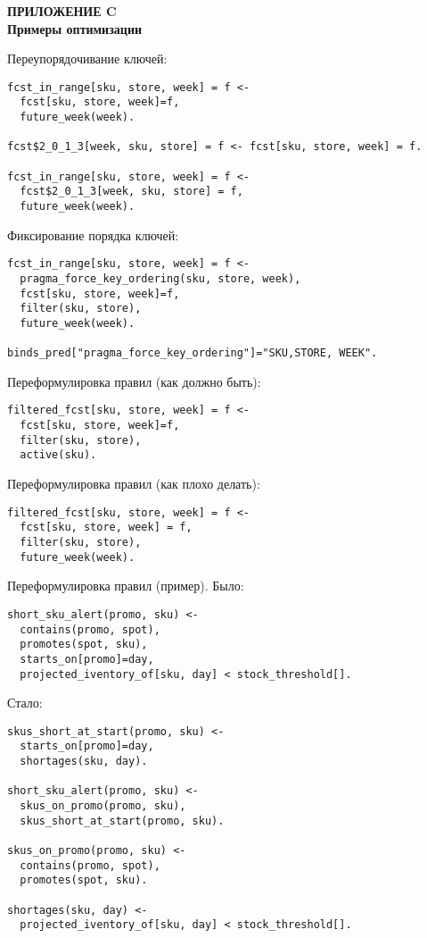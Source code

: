 \newpage
\begin{center}
\textbf{
\MakeUppercase{Приложение C}\\
Примеры оптимизации}
\end{center}

Переупорядочивание ключей:

\begin{lstlisting}
fcst_in_range[sku, store, week] = f <-
  fcst[sku, store, week]=f,
  future_week(week).

fcst$2_0_1_3[week, sku, store] = f <- fcst[sku, store, week] = f.

fcst_in_range[sku, store, week] = f <-
  fcst$2_0_1_3[week, sku, store] = f,
  future_week(week).
\end{lstlisting}

Фиксирование порядка ключей:

\begin{lstlisting}
fcst_in_range[sku, store, week] = f <-
  pragma_force_key_ordering(sku, store, week),
  fcst[sku, store, week]=f,
  filter(sku, store),
  future_week(week).

binds_pred["pragma_force_key_ordering"]="SKU,STORE, WEEK".
\end{lstlisting}

Переформулировка правил (как должно быть):

\begin{lstlisting}
filtered_fcst[sku, store, week] = f <-
  fcst[sku, store, week]=f,
  filter(sku, store),
  active(sku).
\end{lstlisting}

Переформулировка правил (как плохо делать):

\begin{lstlisting}
filtered_fcst[sku, store, week] = f <-
  fcst[sku, store, week] = f,
  filter(sku, store),
  future_week(week).
\end{lstlisting}

Переформулировка правил (пример). Было:

\begin{lstlisting}
short_sku_alert(promo, sku) <-
  contains(promo, spot),
  promotes(spot, sku),
  starts_on[promo]=day,
  projected_iventory_of[sku, day] < stock_threshold[].
\end{lstlisting}

Стало:

\begin{lstlisting}
skus_short_at_start(promo, sku) <-
  starts_on[promo]=day,
  shortages(sku, day).

short_sku_alert(promo, sku) <-
  skus_on_promo(promo, sku),
  skus_short_at_start(promo, sku).

skus_on_promo(promo, sku) <-
  contains(promo, spot),
  promotes(spot, sku).

shortages(sku, day) <-
  projected_iventory_of[sku, day] < stock_threshold[].
\end{lstlisting}
